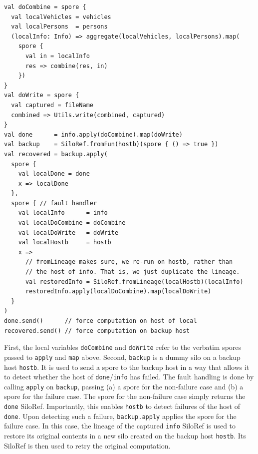 \documentclass{jfp1}
\begin{document}
{\begin{lstlisting}
val doCombine = spore {
  val localVehicles = vehicles
  val localPersons  = persons
  (localInfo: Info) => aggregate(localVehicles, localPersons).map(
    spore {
      val in = localInfo
      res => combine(res, in)
    })
}
val doWrite = spore {
  val captured = fileName
  combined => Utils.write(combined, captured)
}
val done      = info.apply(doCombine).map(doWrite)
val backup    = SiloRef.fromFun(hostb)(spore { () => true })
val recovered = backup.apply(
  spore {
    val localDone = done
    x => localDone
  },
  spore { // fault handler
    val localInfo      = info
    val localDoCombine = doCombine
    val localDoWrite   = doWrite
    val localHostb     = hostb
    x =>
      // fromLineage makes sure, we re-run on hostb, rather than
      // the host of info. That is, we just duplicate the lineage.
      val restoredInfo = SiloRef.fromLineage(localHostb)(localInfo)
      restoredInfo.apply(localDoCombine).map(localDoWrite)
  }
)
done.send()      // force computation on host of local
recovered.send() // force computation on backup host
\end{lstlisting}
\noindent

First, the local variables \verb|doCombine| and \verb|doWrite| refer to the
verbatim spores passed to \verb|apply| and \verb|map| above. Second,
\verb|backup| is a dummy silo on a backup host \verb|hostb|. It is used to send
a spore to the backup host in a way that allows it to detect whether the host of
\verb|done|/\verb|info| has failed. The fault handling is done by calling
\verb|apply| on \verb|backup|, passing (a) a spore for the non-failure case
and (b) a spore for the failure case. The spore for the non-failure case simply
returns the \verb|done| SiloRef. Importantly, this enables \verb|hostb| to
detect failures of the host of \verb|done|. Upon detecting such a failure,
\verb|backup.apply| applies the spore for the failure case. In this case, the
lineage of the captured \verb|info| SiloRef is used to restore its original
contents in a new silo created on the backup host \verb|hostb|. Its SiloRef is
then used to retry the original computation.
}
\end{document}
